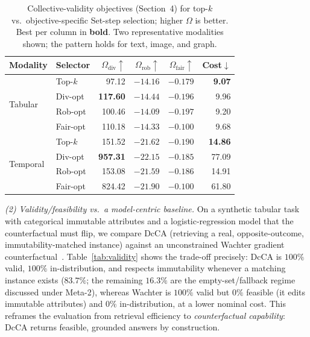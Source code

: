 \begin{table}[h]
\centering\small
\caption{Collective-validity objectives (Section~4) for top-$k$ vs.\ objective-specific Set-step selection; higher $\Omega$ is better. Best per column in \textbf{bold}. Two representative modalities shown; the pattern holds for text, image, and graph.}
\label{tab:quality}
\begin{tabular}{llrrrr}
\toprule
Modality & Selector & $\Omega_{\text{div}}\!\uparrow$ & $\Omega_{\text{rob}}\!\uparrow$ & $\Omega_{\text{fair}}\!\uparrow$ & Cost$\downarrow$ \\
\midrule
\multirow{4}{*}{Tabular}
 & Top-$k$   & 97.12  & $-14.16$ & $-0.179$ & \textbf{9.07} \\
 & Div-opt   & \textbf{117.60} & $-14.44$ & $-0.196$ & 9.96 \\
 & Rob-opt   & 100.46 & \textbf{$-14.09$} & $-0.197$ & 9.20 \\
 & Fair-opt  & 110.18 & $-14.33$ & \textbf{$-0.100$} & 9.68 \\
\midrule
\multirow{4}{*}{Temporal}
 & Top-$k$   & 151.52 & $-21.62$ & $-0.190$ & \textbf{14.86} \\
 & Div-opt   & \textbf{957.31} & $-22.15$ & $-0.185$ & 77.09 \\
 & Rob-opt   & 153.08 & \textbf{$-21.59$} & $-0.186$ & 14.91 \\
 & Fair-opt  & 824.42 & $-21.90$ & \textbf{$-0.100$} & 61.80 \\
\bottomrule
\end{tabular}
\end{table}

\emph{(2) Validity/feasibility vs.\ a model-centric baseline.} On a synthetic tabular task with categorical immutable attributes and a logistic-regression model that the counterfactual must flip, we compare DcCA (retrieving a real, opposite-outcome, immutability-matched instance) against an unconstrained Wachter gradient counterfactual~\cite{wachter2017counterfactual}. Table~\ref{tab:validity} shows the trade-off precisely: DcCA is $100\%$ valid, $100\%$ in-distribution, and respects immutability whenever a matching instance exists ($83.7\%$; the remaining $16.3\%$ are the empty-set/fallback regime discussed under Meta-2), whereas Wachter is $100\%$ valid but $0\%$ feasible (it edits immutable attributes) and $0\%$ in-distribution, at a lower nominal cost. This reframes the evaluation from retrieval efficiency to \emph{counterfactual capability}: DcCA returns feasible, grounded answers by construction.

